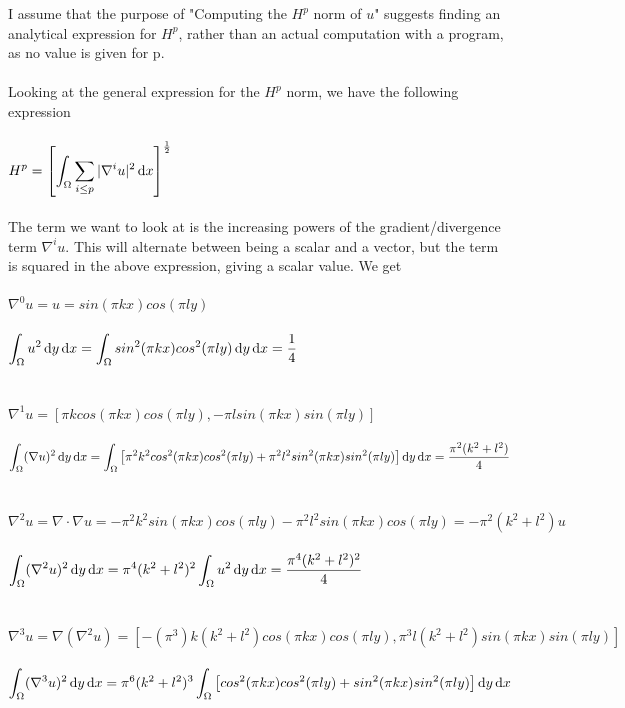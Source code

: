 \documentclass[a4paper,english,12pt,twoside]{article}
\begin{document}
I assume that the purpose of "Computing the $H^p$ norm of $u$" suggests finding an analytical expression for $H^p$, rather than an actual computation with a program, as no value is given for p.\\
\\
Looking at the general expression for the $H^p$ norm, we have the following expression\\
\\
$\displaystyle H^p = \left[\int_{\Omega}\sum_{i\leq p}|\nabla^i u|^2 \mathop{}\!\mathrm{d} x \right]^ \frac{1}{2}$\\
\\
The term we want to look at is the increasing powers of the gradient/divergence term $\nabla^i u$. This will alternate between being a scalar and a vector, but the term is squared in the above expression, giving a scalar value. We get\\
\\
$\nabla^0 u = u = sin(\pi k x)cos(\pi l y)$\\
\\
$\displaystyle \int_{\Omega}u^2 \mathop{}\!\mathrm{d} y \mathop{}\!\mathrm{d} x = \int_{\Omega}sin^2(\pi k x)cos^2(\pi l y) \mathop{}\!\mathrm{d} y \mathop{}\!\mathrm{d} x = \frac{1}{4}$\\
\\
\\
$\nabla^1 u = \left[\pi k cos(\pi k x)cos(\pi l y), -\pi l sin(\pi k x)sin(\pi l y) \right]$\\
\\
$\displaystyle \int_{\Omega}(\nabla u)^2 \mathop{}\!\mathrm{d} y \mathop{}\!\mathrm{d} x = \int_{\Omega}\left[\pi^2k^2cos^2(\pi k x)cos^2(\pi l y) + \pi^2l^2sin^2(\pi k x)sin^2(\pi l y)\right] \mathop{}\!\mathrm{d} y \mathop{}\!\mathrm{d} x = \frac{\pi^2(k^2 + l^2)}{4}$\\
\\
\\
$\nabla^2 u = \nabla\cdot\nabla u = -\pi^2 k^2 sin(\pi k x)cos(\pi l y) -\pi^2 l^2 sin(\pi k x)cos(\pi l y) = -\pi^2(k^2 + l^2)u$\\
\\
$\displaystyle \int_{\Omega}(\nabla^2 u)^2 \mathop{}\!\mathrm{d} y \mathop{}\!\mathrm{d} x = \pi^4(k^2 + l^2)^2\int_{\Omega}u^2 \mathop{}\!\mathrm{d} y \mathop{}\!\mathrm{d} x = \frac{\pi^4(k^2 + l^2)^2}{4}$\\
\\
\\
$\nabla^3 u = \nabla(\nabla^2u) = \left[-(\pi^3) k(k^2 + l^2) cos(\pi k x)cos(\pi l y), \pi^3 l (k^2 + l^2) sin(\pi k x)sin(\pi l y) \right]$\\
\\
$\displaystyle \int_{\Omega}(\nabla^3 u)^2 \mathop{}\!\mathrm{d} y \mathop{}\!\mathrm{d} x = \pi^6(k^2 + l^2)^3\int_{\Omega}\left[cos^2(\pi k x)cos^2(\pi l y) + sin^2(\pi k x)sin^2(\pi l y)\right] \mathop{}\!\mathrm{d} y \mathop{}\!\mathrm{d} x$\\
\end{document}
